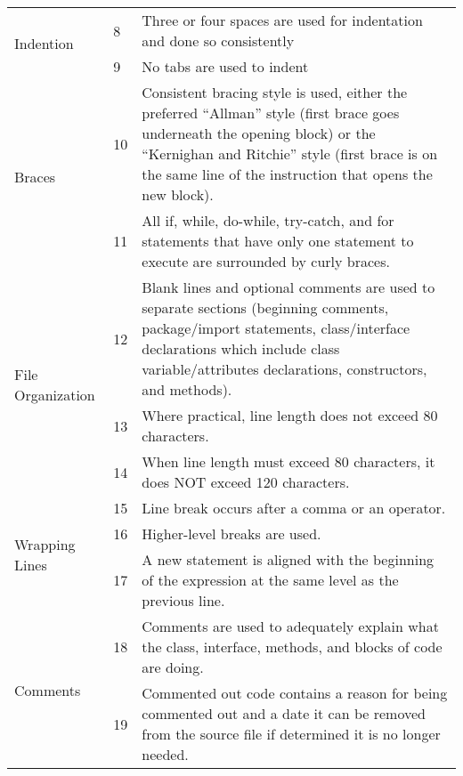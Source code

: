 \documentclass[11pt, a4paper,titlepage]{article}
\begin{document}
						\begin{tabularx}{\textwidth}{| X | l | X |}
							\hline
	\multirow{2}{*}{Indention} 			& \label{itm:8} 8 & 
										Three or four spaces are used for indentation and done so consistently \\	\cline{2-3}
										& \label{itm:9} 9 &  
										No tabs are used to indent	\\ \hline
	\multirow{2}{*}{Braces} 			& \label{itm:10} 10 &  
										Consistent bracing style is used, either the preferred “Allman” style (first
										brace goes underneath the opening block) or the “Kernighan and Ritchie”
										style (first brace is on the same line of the instruction that opens the new
										block).	\\	\cline{2-3}
										& \label{itm:11} 11 &  
										All if, while, do-while, try-catch, and for statements that have only one
										statement to execute are surrounded by curly braces.	\\   \hline
										
	\multirow{3}{*}{File Organization} 	& \label{itm:12} 12 &  
										Blank lines and optional comments are used to separate sections
										(beginning comments, package/import statements, class/interface
										declarations which include class variable/attributes declarations,
										constructors, and methods).\\	\cline{2-3}
										& \label{itm:13} 13 &  
										Where practical, line length does not exceed 80 characters.\\	\cline{2-3}
										& \label{itm:14} 14 &  
										When line length must exceed 80 characters, it does NOT exceed 120
										characters.\\   \hline
	\multirow{3}{*}{Wrapping Lines} 	& \label{itm:15} 15 &  
										Line break occurs after a comma or an operator.\\	\cline{2-3}
										& \label{itm:16} 16 &  
										Higher-level breaks are used.\\	\cline{2-3}
										& \label{itm:17} 17 &  
										A new statement is aligned with the beginning of the expression at the
										same level as the previous line.\\   \hline
	\multirow{2}{*}{Comments} 			& \label{itm:18} 18 &  
										Comments are used to adequately explain what the class, interface,
										methods, and blocks of code are doing.\\	\cline{2-3}
										& \label{itm:19} 19 &  
										Commented out code contains a reason for being commented out and a
										date it can be removed from the source file if determined it is no longer
										needed.\\   \hline
									\end{tabularx}
									
\end{document}
